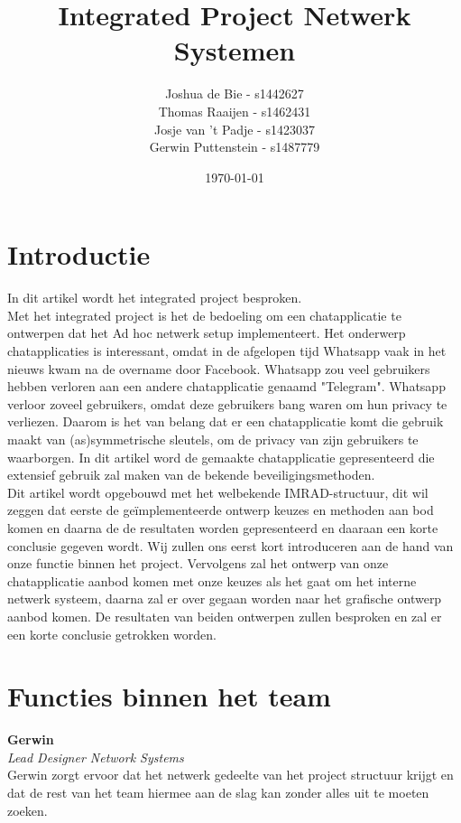 \documentclass[12pt]{article}
\author{Joshua de Bie - s1442627\\Thomas Raaijen - s1462431\\Josje van 't Padje - s1423037\\Gerwin Puttenstein - s1487779}
\date{\today}
\title{Integrated Project Netwerk Systemen}
\begin{document}
\maketitle
\thispagestyle{empty}
\setcounter{page}{0}
\newpage

\tableofcontents
\newpage

\section{Introductie}
In dit artikel wordt het integrated project besproken.\\ Met het integrated project is het de bedoeling om een chatapplicatie te ontwerpen dat het Ad hoc netwerk setup implementeert. Het onderwerp chatapplicaties is interessant, omdat in de afgelopen tijd Whatsapp vaak in het nieuws kwam na de overname door Facebook. Whatsapp zou veel gebruikers hebben verloren aan een andere chatapplicatie genaamd "Telegram". Whatsapp verloor zoveel gebruikers, omdat deze gebruikers bang waren om hun privacy te verliezen. Daarom is het van belang dat er een chatapplicatie komt die gebruik maakt van (as)symmetrische sleutels, om de privacy van zijn gebruikers te waarborgen. In dit artikel word de gemaakte chatapplicatie gepresenteerd die extensief gebruik zal maken van de bekende beveiligingsmethoden.\\
Dit artikel wordt opgebouwd met het welbekende IMRAD-structuur, dit wil zeggen dat eerste de ge\"implementeerde ontwerp keuzes en methoden aan bod komen en daarna de de resultaten worden gepresenteerd en daaraan een korte conclusie gegeven wordt. Wij zullen ons eerst kort introduceren aan de hand van onze functie binnen het project. Vervolgens zal het ontwerp van onze chatapplicatie aanbod komen met onze keuzes als het gaat om het interne netwerk systeem, daarna zal er over gegaan worden naar het grafische ontwerp aanbod komen. De resultaten van beiden ontwerpen zullen besproken en zal er een korte conclusie getrokken worden. 
\newpage

\section{Functies binnen het team}
\label{taken}
\textbf{Gerwin} \\
\emph{Lead Designer Network Systems} \\
Gerwin zorgt ervoor dat het netwerk gedeelte van het project structuur krijgt en dat de rest van het team hiermee aan de slag kan zonder alles uit te moeten zoeken.
\\
\end{document}
